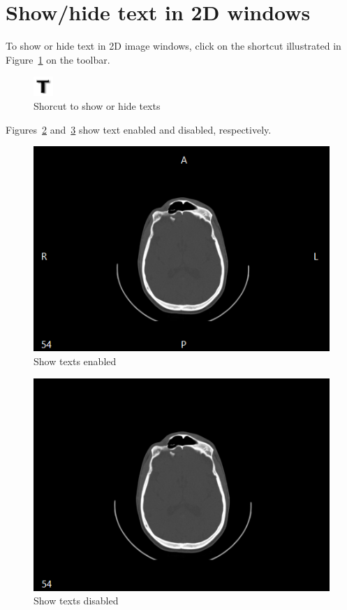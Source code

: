 \newpage

\section{Show/hide text in 2D windows}

To show or hide text in 2D image windows, click on the shortcut illustrated in Figure~\ref{fig:text} on the toolbar.

\begin{figure}[!htb]
\centering
\includegraphics[scale=0.7]{../user_guide_figures/icons/text.png}
\caption{Shorcut to show or hide texts}
\label{fig:text}
\end{figure}

Figures~\ref{fig:text_on} and~\ref{fig:text_off} show text enabled and disabled, respectively.

\begin{figure}[!htb]
\centering
\includegraphics[scale=0.5]{../user_guide_figures/invesalius_screen/axial_en.png}
\caption{Show texts enabled}
\label{fig:text_on}
\end{figure}

\begin{figure}[!htb]
\centering
\includegraphics[scale=0.5]{../user_guide_figures/invesalius_screen/axial_no_tex_en.png}
\caption{Show texts disabled}
\label{fig:text_off}
\end{figure}
